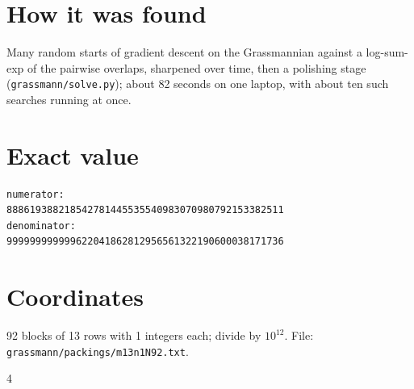 \documentclass[11pt,a4paper]{article}
\begin{document}
\section{How it was found}
Many random starts of gradient descent on the Grassmannian against a log-sum-exp of the pairwise overlaps, sharpened over time, then a polishing stage (\texttt{grassmann/solve.py}); about 82 seconds on one laptop, with about ten such searches running at once.


\appendix
\section{Exact value}
{\small
\begin{verbatim}
numerator:
888619388218542781445535540983070980792153382511
denominator:
999999999999622041862812956561322190600038171736
\end{verbatim}}

\section{Coordinates}
92 blocks of 13 rows with 1 integers each; divide by $10^{12}$. File: \texttt{grassmann/packings/m13n1N92.txt}.
{\tiny
\begin{multicols}{4}
\end{multicols}}
\end{document}
